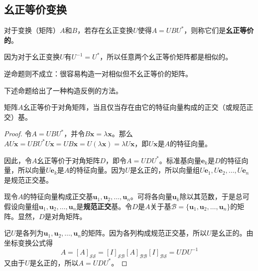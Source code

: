 \subsection{幺正等价变换}

\begin{definition*}
    对于变换（矩阵）$A$和$B$，若存在幺正变换$U$使得$A=UBU^*$，则称它们是{\bf 幺正等价的}。
\end{definition*}

因为对于幺正变换$U$有$U^{-1}=U^*$，所以任意两个幺正等价矩阵都是相似的。

逆命题则不成立：很容易构造一对相似但不幺正等价的矩阵。

下述命题给出了一种构造反例的方法。

\begin{proposition}
    矩阵$A$幺正等价于对角矩阵，当且仅当存在由它的特征向量构成的正交（或规范正交）基。
\end{proposition}

\begin{proof}
    令$A=UBU^*$，并令$B\mathbf{x}=\lambda\mathbf{x}$。那么$AU\mathbf{x}=UBU^*U\mathbf{x}=UB\mathbf{x}=U(\lambda\mathbf{x})=\lambda U\mathbf{x}$，即$U\mathbf{x}$是$A$的特征向量。

    因此，令$A$幺正等价于对角矩阵$D$，即令$A=UDU^*$。标准基向量$\mathbf{e}_k$是$D$的特征向量，所以向量$U\mathbf{e}_k$是$A$的特征向量。因为$U$是幺正的，所以向量组$U\mathbf{e}_1,U\mathbf{e}_2,\ldots,U\mathbf{e}_n$是规范正交基。

    现令$A$的特征向量构成正交基$\mathbf{u}_{1},\mathbf{u}_{2},\ldots,\mathbf{u}_{n}$。可将各向量$\mathbf{u}_{k}$除以其范数，于是总可假设向量组$\mathbf{u}_{1},\mathbf{u}_{2},\ldots,\mathbf{u}_{n}$是\textbf{规范正交}基。令$D$是$A$关于基$\mathcal{B}=\{\mathbf{u}_{1},\mathbf{u}_{2},\ldots,\mathbf{u}_{n}\}$的矩阵。显然，$D$是对角矩阵。

    记$U$是各列为$\mathbf{u}_{1},\mathbf{u}_{2},\ldots,\mathbf{u}_{n}$的矩阵。因为各列构成规范正交基，所以$U$是幺正的。由坐标变换公式得\[A=\left[A\right]_{\mathcal{SS}}=\left[I\right]_{\mathcal{SB}}[A]_{\mathcal{BB}}[I]_{\mathcal{BS}}=UDU^{-1}\]
    又由于$U$是幺正的，所以$A=UDU^*$。
\end{proof}

